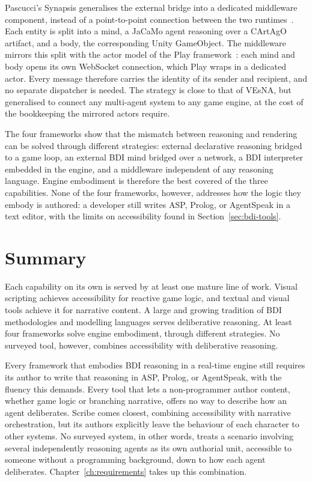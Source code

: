 Pascucci's Synapsis generalises the external bridge into a dedicated middleware component, instead of a point-to-point connection between the two runtimes~\cite{Pascucci2019}. Each entity is split into a mind, a JaCaMo agent reasoning over a CArtAgO artifact, and a body, the corresponding Unity GameObject. The middleware mirrors this split with the actor model of the Play framework~\cite{PlayFramework}: each mind and body opens its own WebSocket connection, which Play wraps in a dedicated actor. Every message therefore carries the identity of its sender and recipient, and no separate dispatcher is needed. The strategy is close to that of VEsNA, but generalised to connect any multi-agent system to any game engine, at the cost of the bookkeeping the mirrored actors require.
 
The four frameworks show that the mismatch between reasoning and rendering can be solved through different strategies: external declarative reasoning bridged to a game loop, an external BDI mind bridged over a network, a BDI interpreter embedded in the engine, and a middleware independent of any reasoning language. Engine embodiment is therefore the best covered of the three capabilities. None of the four frameworks, however, addresses how the logic they embody is authored: a developer still writes ASP, Prolog, or AgentSpeak in a text editor, with the limits on accessibility found in Section~\ref{sec:bdi-tools}.
 

\section{Summary}
\label{sec:related-work-summary}


Each capability on its own is served by at least one mature line of work. Visual scripting achieves accessibility for reactive game logic, and textual and visual tools achieve it for narrative content. A large and growing tradition of BDI methodologies and modelling languages serves deliberative reasoning. At least four frameworks solve engine embodiment, through different strategies. No surveyed tool, however, combines accessibility with deliberative reasoning.
 
Every framework that embodies BDI reasoning in a real-time engine still requires its author to write that reasoning in ASP, Prolog, or AgentSpeak, with the fluency this demands. Every tool that lets a non-programmer author content, whether game logic or branching narrative, offers no way to describe how an agent deliberates. Scribe comes closest, combining accessibility with narrative orchestration, but its authors explicitly leave the behaviour of each character to other systems. No surveyed system, in other words, treats a scenario involving several independently reasoning agents as its own authorial unit, accessible to someone without a programming background, down to how each agent deliberates. Chapter~\ref{ch:requirements} takes up this combination.
 
